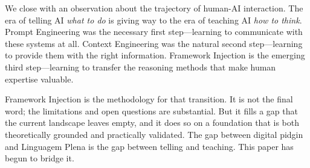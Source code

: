 \documentclass[12pt,a4paper]{article}
\begin{document}
We close with an observation about the trajectory of human-AI interaction. The era of telling AI \emph{what to do} is giving way to the era of teaching AI \emph{how to think}. Prompt Engineering was the necessary first step---learning to communicate with these systems at all. Context Engineering was the natural second step---learning to provide them with the right information. Framework Injection is the emerging third step---learning to transfer the reasoning methods that make human expertise valuable.

Framework Injection is the methodology for that transition. It is not the final word; the limitations and open questions are substantial. But it fills a gap that the current landscape leaves empty, and it does so on a foundation that is both theoretically grounded and practically validated. The gap between digital pidgin and Linguagem Plena is the gap between telling and teaching. This paper has begun to bridge it.
\end{document}
